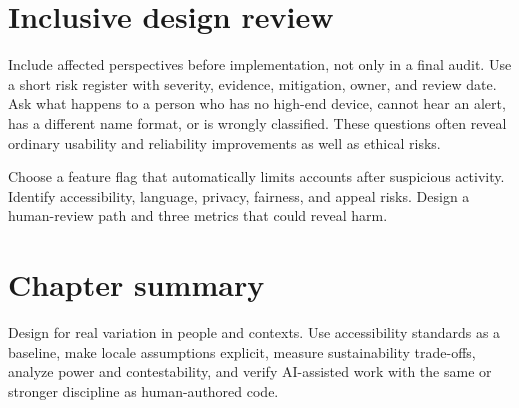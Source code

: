 \section{Inclusive design review}
Include affected perspectives before implementation, not only in a final audit.
Use a short risk register with severity, evidence, mitigation, owner, and review
date. Ask what happens to a person who has no high-end device, cannot hear an
alert, has a different name format, or is wrongly classified. These questions
often reveal ordinary usability and reliability improvements as well as ethical
risks.

\begin{exercise}
Choose a feature flag that automatically limits accounts after suspicious
activity. Identify accessibility, language, privacy, fairness, and appeal risks.
Design a human-review path and three metrics that could reveal harm.
\end{exercise}

\section{Chapter summary}
Design for real variation in people and contexts. Use accessibility standards as
a baseline, make locale assumptions explicit, measure sustainability trade-offs,
analyze power and contestability, and verify AI-assisted work with the same or
stronger discipline as human-authored code.

